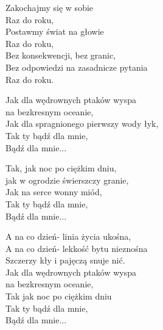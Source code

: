 \begin{text}
\vin Zakochajmy się w sobie\\
\vin Raz do roku, \\
\vin Postawmy świat na głowie\\
\vin Raz do roku, \\
\vin Bez konsekwencji, bez granic, \\
\vin Bez odpowiedzi na zasadnicze pytania\\
\vin Raz do roku. 

Jak dla wędrownych ptaków wyspa\\
na bezkresnym oceanie, \\
Jak dla spragnionego pierwszy wody łyk, \\
Tak ty bądź dla mnie, \\
Bądź dla mnie... 

Tak, jak noc po ciężkim dniu,\\
jak w ogrodzie świerszczy granie,\\
Jak na serce wonny miód,\\
Tak ty bądź dla mnie,\\
Bądź dla mnie...

A na co dzień- linia życia ukośna, \\
A na co dzień- lekkość bytu nieznośna \\
Szczerzy kły i pajęczą snuje nić. \\

Jak dla wędrownych ptaków wyspa\\
na bezkresnym oceanie,\\
Tak jak noc po ciężkim dniu\\
Tak ty bądź dla mnie,\\
Bądź dla mnie...
\end{text}